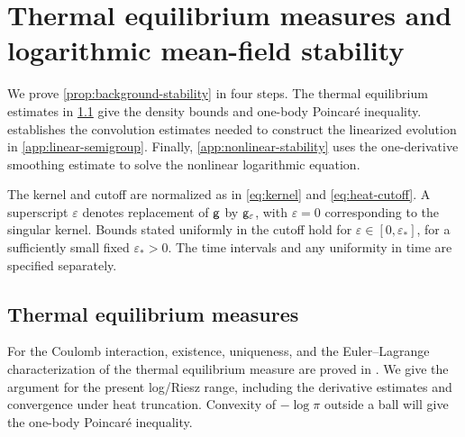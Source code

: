 \documentclass[11pt,reqno]{amsart}
\numberwithin{equation}{section}
\theoremstyle{plain}
\theoremstyle{remark}
\begin{document}
\par\endgroup

\appendix
\begingroup

\section{Thermal equilibrium measures and logarithmic mean-field stability}\label{app:background}

We prove \cref{prop:background-stability} in four steps. The thermal equilibrium estimates in \cref{app:thermal-profiles} give the density bounds and one-body Poincar\'e inequality.  establishes the convolution estimates needed to construct the linearized evolution in \cref{app:linear-semigroup}. Finally, \cref{app:nonlinear-stability} uses the one-derivative smoothing estimate to solve the nonlinear logarithmic equation.

The kernel and cutoff are normalized as in \eqref{eq:kernel} and \eqref{eq:heat-cutoff}. A superscript $\varepsilon$ denotes replacement of $\mathsf g$ by $\mathsf g_\varepsilon$, with $\varepsilon=0$ corresponding to the singular kernel. Bounds stated uniformly in the cutoff hold for $\varepsilon\in[0,\varepsilon_*]$, for a sufficiently small fixed $\varepsilon_*>0$. The time intervals and any uniformity in time are specified separately.

\subsection{Thermal equilibrium measures}\label{app:thermal-profiles}
For the Coulomb interaction, existence, uniqueness, and the Euler--Lagrange characterization of the thermal equilibrium measure are proved in \cite[Lemmas~2.1--2.2]{ArmstrongSerfatyThermal}. We give the argument for the present log/Riesz range, including the derivative estimates and convergence under heat truncation. Convexity of $-\log\pi$ outside a ball will give the one-body Poincar\'e inequality.
\end{document}
